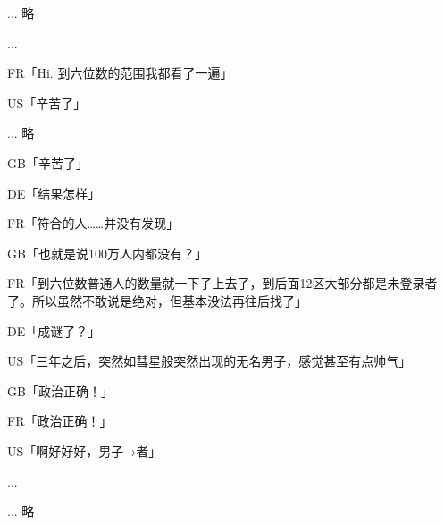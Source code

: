 ... 略

...

FR「Hi. 到六位数的范围我都看了一遍」

US「辛苦了」

... 略

GB「辛苦了」

DE「结果怎样」

FR「符合的人……并没有发现」

GB「也就是说100万人内都没有？」

FR「到六位数普通人的数量就一下子上去了，到后面12区大部分都是未登录者了。所以虽然不敢说是绝对，但基本没法再往后找了」

DE「成谜了？」

US「三年之后，突然如彗星般突然出现的无名男子，感觉甚至有点帅气」

GB「政治正确！」

FR「政治正确！」

US「啊好好好，男子→者」

...

... 略\\